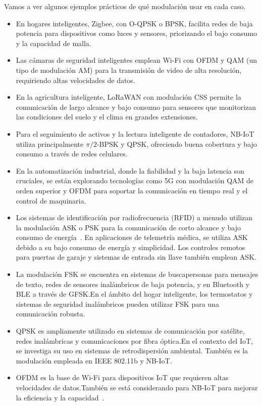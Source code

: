 \documentclass[12pt, letterpaper]{article}
\begin{document}
Vamos a ver algunos ejemplos prácticos de qué modulación usar en cada caso.
\begin{itemize}
    \item En hogares inteligentes, Zigbee, con O-QPSK o BPSK, facilita redes de baja potencia para dispositivos como luces y sensores, priorizando el bajo consumo y la capacidad de malla.
    \item Las cámaras de seguridad inteligentes emplean Wi-Fi con OFDM y QAM (un tipo de modulación AM) para la transmisión de video de alta resolución, requiriendo altas velocidades de datos.
    \item En la agricultura inteligente, LoRaWAN con modulación CSS permite la comunicación de largo alcance y bajo consumo para sensores que monitorizan las condiciones del suelo y el clima en grandes extensiones.
    \item Para el seguimiento de activos y la lectura inteligente de contadores, NB-IoT utiliza principalmente $\pi/2$-BPSK y QPSK, ofreciendo buena cobertura y bajo consumo a través de redes celulares.
    \item En la automatización industrial, donde la fiabilidad y la baja latencia son cruciales, se están explorando tecnologías como 5G con modulación QAM de orden superior y OFDM para soportar la comunicación en tiempo real y el control de maquinaria.
    \item Los sistemas de identificación por radiofrecuencia (RFID) a menudo utilizan la modulación ASK o PSK para la comunicación de corto alcance y bajo consumo de energía~\cite{yin2025low}. En aplicaciones de telemetría médica, se utiliza ASK debido a su bajo consumo de energía y simplicidad. Los controles remotos para puertas de garaje y sistemas de entrada sin llave también emplean ASK.\@
    \item La modulación FSK se encuentra en sistemas de buscapersonas para mensajes de texto, redes de sensores inalámbricos de baja potencia, y en Bluetooth y BLE a través de GFSK.En el ámbito del hogar inteligente, los termostatos y sistemas de seguridad inalámbricos pueden utilizar FSK para una comunicación robusta.
    \item QPSK es ampliamente utilizado en sistemas de comunicación por satélite, redes inalámbricas y comunicaciones por fibra óptica.En el contexto del IoT, se investiga su uso en sistemas de retrodispersión ambiental. También es la modulación empleada en IEEE 802.11b y NB-IoT.
    \item OFDM es la base de Wi-Fi para dispositivos IoT que requieren altas velocidades de datos.También se está considerando para NB-IoT para mejorar la eficiencia y la capacidad~\cite{cardarilli2021design}.
\end{itemize}
\end{document}
